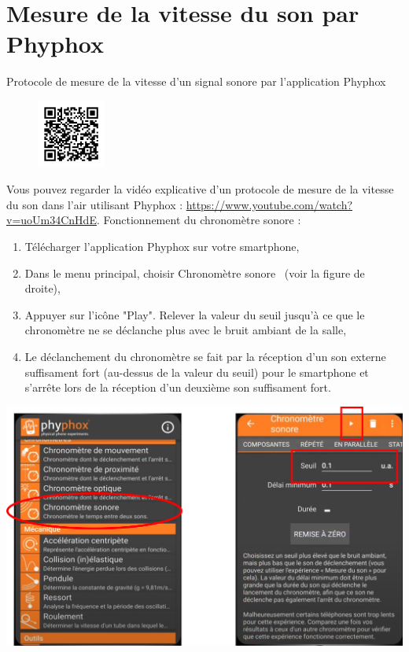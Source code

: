 \newpage

\section{Mesure de la vitesse du son par Phyphox}

\begin{doc}{Protocole de mesure de la vitesse d'un signal sonore par l'application Phyphox}
\begin{figure}
\vspace{-2cm}
    \centering
     \includegraphics[width=0.2\textwidth]{Images/TP/TP7/qrcode_phyphox.png}
\end{figure}
Vous pouvez regarder la vidéo explicative d'un protocole de mesure de la vitesse du son dans l'air utilisant Phyphox : \url{https://www.youtube.com/watch?v=uoUm34CnHdE}.\newline
Fonctionnement du chronomètre sonore :
\begin{enumerate}
    \item Télécharger l'application Phyphox sur votre smartphone,
    \item Dans le menu principal, choisir \og Chronomètre sonore \fg ~(voir la figure de droite),
    \item Appuyer sur l'icône "Play". Relever la valeur du seuil jusqu'à ce que le chronomètre ne se déclanche plus avec le bruit ambiant de la salle,
    \item Le déclanchement du chronomètre se fait par la réception d'un son externe suffisament fort (au-dessus de la valeur du seuil) pour le smartphone et s'arrête lors de la réception d'un deuxième son suffisament fort.
\end{enumerate}

\begin{center}
    \includegraphics[scale=0.7]{Images/TP/TP7/Phyphox_1.png}
  \end{center}
\end{doc}
\newpage

